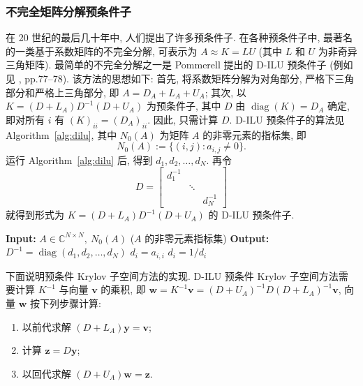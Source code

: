 \subsubsection{{不完全矩阵分解预条件子}}\label{subsec:incomplete-decomposition-preconditioners}
{在 20 世纪的最后几十年中, 人们提出了许多预条件子. 在各种预条件子中, 最著名的一类基于系数矩阵的不完全分解, 可表示为 $A\approx K=LU$ (其中 $L$ 和 $U$ 为非奇异三角矩阵).}
{最简单的不完全分解之一是 Pommerell 提出的 D-ILU 预条件子 (例如见 , pp.77--78). 该方法的思想如下: 首先, 将系数矩阵分解为对角部分, 严格下三角部分和严格上三角部分, 即 $A=D_A+L_A+U_A$; 其次, 以 $K=(D+L_A)D^{-1}(D+U_A)$ 为预条件子, 其中 $D$ 由 $\operatorname{diag}(K)=D_A$ 确定, 即对所有 $i$ 有 $(K)_{ii}=(D_A)_{ii}$. 因此, 只需计算 $D$.}
{D-ILU 预条件子的算法见 Algorithm\ \ref{alg:dilu}, 其中 $N_0(A)$ 为矩阵 $A$ 的非零元素的指标集, 即}
\[N_0(A):=\{(i,j):a_{i,j}\ne0\}.\]
{运行 Algorithm\ \ref{alg:dilu} 后, 得到 $d_1,d_2,\ldots,d_N$. 再令}
\[D=\begin{bmatrix}d_1^{-1}&&\\&\ddots&\\&&d_N^{-1}\end{bmatrix}\]
{就得到形式为 $K=(D+L_A)D^{-1}(D+U_A)$ 的 D-ILU 预条件子.}
\begin{algorithm}[H]\caption{{D-ILU 分解}}\label{alg:dilu}\begin{algorithmic}[1]
\Statex\textbf{Input:} $A\in\mathbb C^{N\times N},\ N_0(A)$ {($A$ 的非零元素指标集)}
\Statex\textbf{Output:} $D^{-1}=\operatorname{diag}(d_1,d_2,\ldots,d_N)$
\State $d_i=a_{i,i}$
\EndFor
{}
\State $d_i=1/d_i$
\EndFor\EndFor\end{algorithmic}\end{algorithm}
{下面说明预条件 Krylov 子空间方法的实现. D-ILU 预条件 Krylov 子空间方法需要计算 $K^{-1}$ 与向量 $\bm v$ 的乘积, 即 $\bm w=K^{-1}\bm v=(D+U_A)^{-1}D(D+L_A)^{-1}\bm v$, 向量 $\bm w$ 按下列步骤计算:}
\begin{enumerate}
\item {以前代求解 $(D+L_A)\bm y=\bm v$;}
\item {计算 $\bm z=D\bm y$;}
\item {以回代求解 $(D+U_A)\bm w=\bm z$.}
\end{enumerate}
